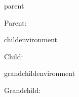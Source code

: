 \documentclass[12pt]{pnpprep}
\begin{document}
\begin{blueprint}{parent}


    \begin{render}
        Parent: \namevalue

        \renderChildren
    \end{render}
\end{blueprint}


\begin{blueprint}{childenvironment}


    \begin{render}
        Child: \namevalue

        \renderChildren
    \end{render}
\end{blueprint}


\begin{blueprint}{grandchildenvironment}

    \begin{render}
        Grandchild: \namevalue
    \end{render}
\end{blueprint}


\begin{parent}

    \begin{child}

        \begin{grandchild}
        \end{grandchild}

    \end{child}

\end{parent}
\end{document}
